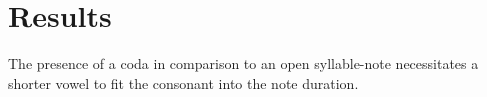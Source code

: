 \chapter{Results}
%

%
%





The presence of a coda in comparison to an open syllable-note necessitates a shorter vowel to fit the consonant into the note duration. 









%
%
%


